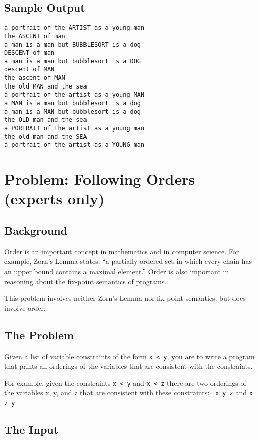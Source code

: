 \subsection*{Sample Output}
\begin{verbatim}
a portrait of the ARTIST as a young man 
the ASCENT of man 
a man is a man but BUBBLESORT is a dog 
DESCENT of man 
a man is a man but bubblesort is a DOG 
descent of MAN 
the ascent of MAN 
the old MAN and the sea 
a portrait of the artist as a young MAN 
a MAN is a man but bubblesort is a dog 
a man is a MAN but bubblesort is a dog 
the OLD man and the sea 
a PORTRAIT of the artist as a young man 
the old man and the SEA 
a portrait of the artist as a YOUNG man 
\end{verbatim}

\clearpage

\section{Problem: Following Orders (experts only)}

\subsection*{Background}

Order is an important concept in mathematics and in computer science.
For example, Zorn's Lemma states:  ``a partially ordered set in which
every chain has an upper bound contains a maximal element.''
Order is also important in reasoning about the fix-point semantics of
programs. 

This problem involves neither Zorn's Lemma nor fix-point semantics, but
does involve order.


\subsection*{The Problem}

Given a list of variable constraints of the form
\verb!x < y!, you are to write a program that prints all
orderings of the variables that are consistent with the constraints.

For example, given the constraints \verb!x < y!  and \verb!x < z! there
are two orderings of the variables x, y, and z that are consistent with these
constraints: \verb! x y z! and \verb!x z y!.

\subsection*{The Input}

